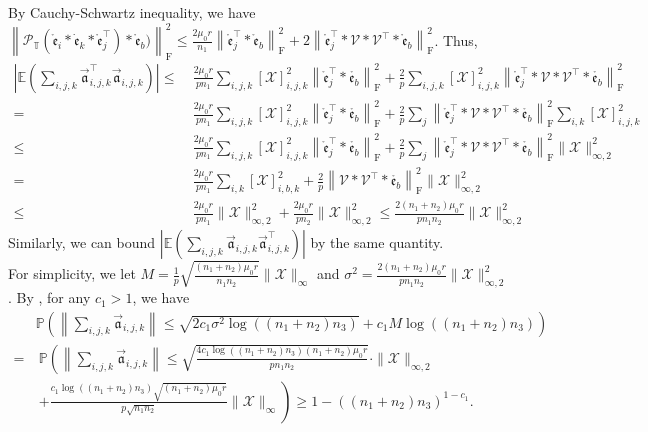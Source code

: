 \documentclass[twoside,12pt]{article}
\def\fro{{\mathrm{F}}}
\def\fro{{\mathrm{F}}}
\def\dme{{\dot{\mathfrak{e}}}}
\def\mrme{{\mathring{\mathfrak{e}}}}
\newcommand{\lx}[1]{\textcolor{pink}{#1}}
\begin{document}
By Cauchy-Schwartz inequality, we have 
$\left\|\mathcal{P}_{\mathbb{T}}(\mrme_i*\dme_k*\mrme_j^{\top})*\mrme_b)\right\|_{\fro}^2 \leq \frac{2\mu_{0}r}{n_1}\left\|\mrme_j^{\top} * \mrme_b\right\|_{\fro}^2+2\left\|\mrme_j^{\top} * \mathcal{V} * \mathcal{V}^{\top} * \mrme_b\right\|_{\fro}^2$. 
  Thus,
\begin{align*}
\left|\mathbb{E}(\sum\limits_{i,j,k}\vec{\mathfrak{a}}_{i,j,k}^{\top}\vec{\mathfrak{a}}_{i,j,k})\right|
\leq&~ \frac{2\mu_0r}{pn_{1}}\sum\limits_{i,j,k}[\mathcal{X}]_{i,j,k}^2\left\|\mrme_{j}^{\top}*\mathring{\mathfrak{e}_b}\right\|_{\fro}^2 + \frac{2}{p}\sum\limits_{i,j,k}[\mathcal{X}]_{i,j,k}^2\left\|\mrme_{j}^{\top}*\mathcal{V}*\mathcal{V}^{\top}*\mathring{\mathfrak{e}_b}\right\|_{\fro}^2   \\
=&~\frac{2\mu_0r}{pn_{1}}\sum\limits_{i,j,k}[\mathcal{X}]_{i,j,k}^2\left\|\mrme_{j}^{\top}*\mathring{\mathfrak{e}_b}\right\|_{\fro}^2 + \frac{2}{p}\sum_{j}\left\|\mrme_{j}^{\top}*\mathcal{V}*\mathcal{V}^{\top}*\mathring{\mathfrak{e}_b}\right\|_{\fro}^2\sum_{i,k}[\mathcal{X}]_{i,j,k}^2 \\
\leq &~\frac{2\mu_0r}{pn_{1}}\sum\limits_{i,j,k}[\mathcal{X}]_{i,j,k}^2\left\|\mrme_{j}^{\top}*\mathring{\mathfrak{e}_b}\right\|_{\fro}^2 + \frac{2}{p}\sum_{j}\left\|\mrme_{j}^{\top}*\mathcal{V}*\mathcal{V}^{\top}*\mathring{\mathfrak{e}_b}\right\|_{\fro}^2\|\mathcal{X}\|_{\infty,2}^2\\
=&~\frac{2\mu_{0}r}{pn_{1}}\sum\limits_{i,k}[\mathcal{X}]_{i,b,k}^2 + \frac{2}{p}\left\|\mathcal{V}*\mathcal{V}^{\top}*\mathring{\mathfrak{e}_b}\right\|_{\fro}^2 \|\mathcal{X}\|_{\infty,2}^2\\
\leq&~ \frac{2\mu_{0}r}{pn_{1}}\|\mathcal{X}\|_{\infty,2}^2 +\frac{2\mu_{0}r}{pn_{2}}\|\mathcal{X}\|_{\infty,2}^2 
\leq \frac{2(n_1+n_2)\mu_{0}r}{pn_{1}n_{2}}\|\mathcal{X}\|_{\infty,2}^2
\end{align*}
Similarly, we can bound $\left|\mathbb{E}(\sum\limits_{i,j,k}\vec{\mathfrak{a}}_{i,j,k}\vec{\mathfrak{a}}_{i,j,k}^{\top})\right|$ by the same quantity.
\\For simplicity, we let $M = \frac{1}{p}\sqrt{\frac{(n_1+n_2)\mu_{0}r}{n_{1}n_{2}}}\|\mathcal{X}\|_{\infty}$ and $\sigma^2 = \frac{2(n_1+n_2)\mu_{0}r}{pn_{1}n_{2}}\|\mathcal{X}\|_{\infty,2}^2$.
By , for any $c_1 > 1$, we have 
\begin{align*}
&\mathbb{P}\left(\left\|\sum\limits_{i,j,k}\vec{\mathfrak{a}}_{i,j,k}\right\|\leq \sqrt{2c_1\sigma^2\log((n_{1}+n_{2})n_3)}+c_{1}M\log((n_{1}+n_{2})n_3)\right) \\
=&~\mathbb{P}\left(\left\|\sum\limits_{i,j,k}\vec{\mathfrak{a}}_{i,j,k}\right\|\leq \sqrt{\frac{4c_1\log\left((n_1+n_2)n_3\right)(n_{1}+n_{2})\mu_{0}r}{pn_{1}n_{2}}}\cdot\|\mathcal{X}\|_{\infty,2} \right.\\
&~\left.+  \frac{c_1\log((n_1+n_2)n_3)\sqrt{(n_1+n_2)\mu_{0}r}}{p\sqrt{n_{1}n_{2}}}\|\mathcal{X}\|_{\infty}\right)\geq 1-((n_1+n_2)n_3)^{1-c_1}. %
\end{align*}
\end{document}
